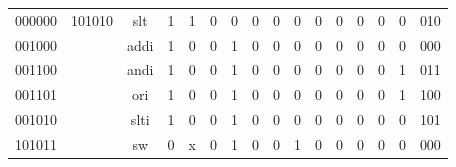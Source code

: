 \documentclass[twocolumn]{article} %
\begin{document}
\begin{sloppypar}
\begin{table}[t]
\begin{tabular}{cccccccccccccccc}
000000                      & 101010                     & slt                   & 1                       & 1                       & 0                       & 0                       & 0                       & 0                       & 0                       & 0                       & 0                       & 0                      & 0                        & 0                        & 010   \\
001000                      &                            & addi                  & 1                       & 0                       & 0                       & 1                       & 0                       & 0                       & 0                       & 0                       & 0                       & 0                      & 0                        & 0                        & 000   \\
001100                      &                            & andi                  & 1                       & 0                       & 0                       & 1                       & 0                       & 0                       & 0                       & 0                       & 0                       & 0                      & 0                        & 1                        & 011   \\
001101                      &                            & ori                   & 1                       & 0                       & 0                       & 1                       & 0                       & 0                       & 0                       & 0                       & 0                       & 0                      & 0                        & 1                        & 100   \\
001010                      &                            & slti                  & 1                       & 0                       & 0                       & 1                       & 0                       & 0                       & 0                       & 0                       & 0                       & 0                      & 0                        & 0                        & 101   \\
101011                      &                            & sw                    & 0                       & x                       & 0                       & 1                       & 0                       & 0                       & 1                       & 0                       & 0                       & 0                      & 0                        & 0                        & 000   \\

\end{tabular}
\end{table}
\end{sloppypar}
\end{document}
